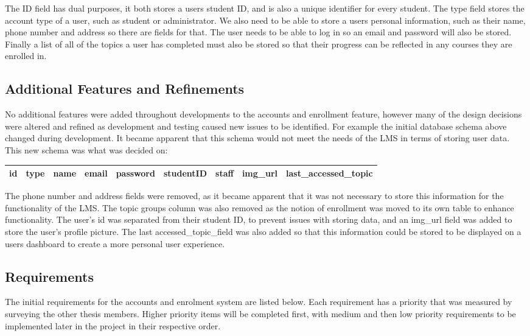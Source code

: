 The ID field has dual purposes, it both stores a users student ID, and is also a unique identifier for every student. The type field stores the account type of a user, such as student or administrator. We also need to be able to store a users personal information, such as their name, phone number and address so there are fields for that. The user needs to be able to log in so an email and password will also be stored. Finally a list of all of the topics a user has completed must also be stored so that their progress can be reflected in any courses they are enrolled in.\\


\subsection{Additional Features and Refinements}

No additional features were added throughout developments to the accounts and enrollment feature, however many of the design decisions were altered and refined as development and testing caused new issues to be identified. For example the initial database schema above changed during development. It became apparent that this schema would not meet the needs of the LMS in terms of storing user data. This new schema was what was decided on:
\begin{center}
    \begin{tabular}{|c|c|c|c|c|c|c|c|c|} 
        \hline
        id & type & name & email & password & studentID & staff & img\_url & last\_accessed\_topic \\ [0.5ex] 
        \hline
    \end{tabular}
\end{center}
The phone number and address fields were removed, as it became apparent that it was not necessary to store this information for the functionality of the LMS. The topic groups column was also removed as the notion of enrollment was moved to its own table to enhance functionality. The user's id was separated from their student ID, to prevent issues with storing data, and an img\_url field was added to store the user's profile picture. The last accessed\_topic\_field was also added so that this information could be stored to be displayed on a users dashboard to create a more personal user experience. 

\subsection{Requirements}
The initial requirements for the accounts and enrolment system are listed below. Each requirement has a priority that was measured by surveying the other thesis members. Higher priority items will be completed first, with medium and then low priority requirements to be implemented later in the project in their respective order.

